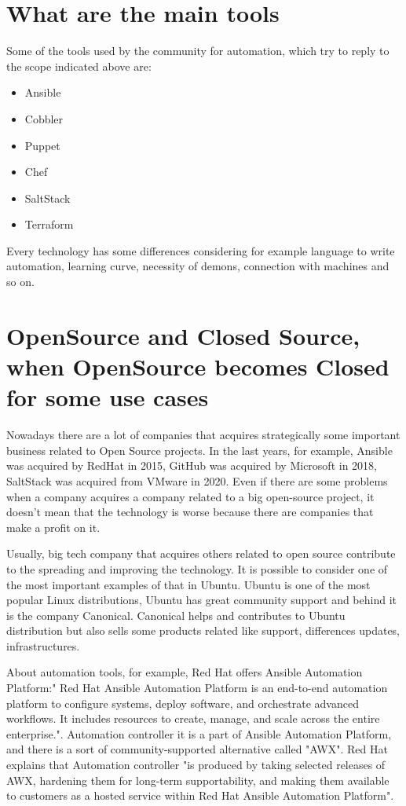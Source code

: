 \documentclass[12pt,a4paper,openright,twoside]{book}
\begin{document}
\section{What are the main tools}
Some of the tools used by the community for automation, which try to reply to the scope indicated above are:

\begin{itemize}
    \item Ansible
    \item Cobbler
    \item Puppet
    \item Chef
    \item SaltStack
    \item Terraform
\end{itemize}

Every technology has some differences considering for example language to write automation, learning curve, necessity of demons, connection with machines and so on.

\section{OpenSource and Closed Source, when OpenSource becomes Closed for some use cases}
Nowadays there are a lot of companies that acquires strategically some important business related to Open Source projects.
In the last years, for example, Ansible was acquired by RedHat in 2015, GitHub was acquired by Microsoft in 2018, SaltStack was acquired from VMware in 2020.
Even if there are some problems when a company acquires a company related to a big open-source project, it doesn't mean that the technology is worse because there are companies that make a profit on it.

Usually, big tech company that acquires others related to open source contribute to the spreading and improving the technology.
It is possible to consider one of the most important examples of that in Ubuntu.
Ubuntu is one of the most popular Linux distributions, Ubuntu has great community support and behind it is the company Canonical.
Canonical helps and contributes to Ubuntu distribution but also sells some products related like support, differences updates, infrastructures.

About automation tools, for example, Red Hat offers Ansible Automation Platform:"
Red Hat Ansible Automation Platform is an end-to-end automation platform to configure systems, deploy software, and orchestrate advanced workflows. It includes resources to create, manage, and scale across the entire enterprise."\cite{ansibleAutomationPlatform}.
Automation controller it is a part of Ansible Automation Platform, and there is a sort of community-supported alternative called "AWX"\cite{ansibleAwxAAP}.
Red Hat explains that Automation controller "is produced by taking selected releases of AWX, hardening them for long-term supportability, and making them available to customers as a hosted service within Red Hat Ansible Automation Platform"\cite{ansibleFaq}.
\end{document}
